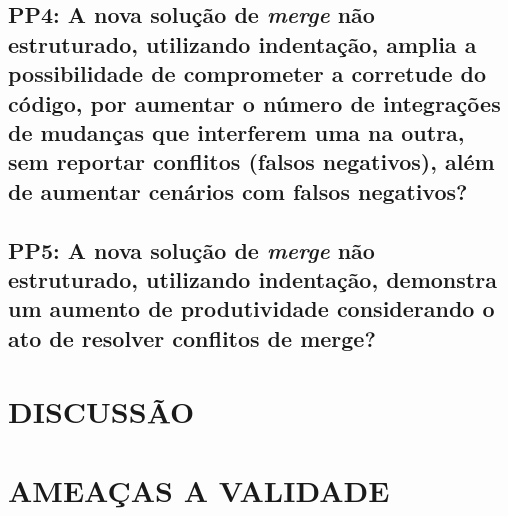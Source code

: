 \subsection{PP4: A nova solução de \emph{merge} não estruturado, utilizando indentação,
	amplia a possibilidade de comprometer a corretude do código, por aumentar o número de
	integrações de mudanças que interferem uma na outra, sem reportar conflitos (falsos negativos),
	além de aumentar cenários com falsos negativos?}
\subsection{PP5: A nova solução de \emph{merge} não estruturado, utilizando indentação,
	demonstra um aumento de produtividade considerando o ato de resolver conflitos de merge?}

\section{DISCUSSÃO}\label{discussao}
\section{AMEAÇAS A VALIDADE}



































